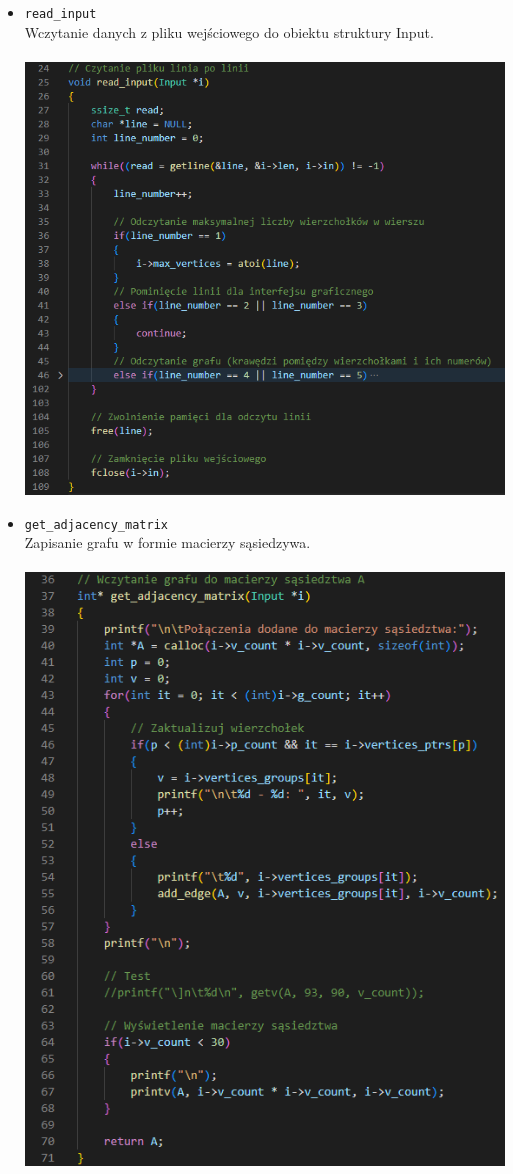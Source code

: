 \documentclass{article}
\begin{document}
\begin{itemize}
        \item \texttt{read\_input} \\
        Wczytanie danych z pliku wejściowego do obiektu struktury Input. \\\\      \includegraphics[width=0.825\linewidth, center]{img/read_input.png}
        
        \item \texttt{get\_adjacency\_matrix} \\
        Zapisanie grafu w formie macierzy sąsiedzywa. \\\\      \includegraphics[width=0.825\linewidth, center]{img/get_adjacency_matrix.png}
        

\end{itemize}
\end{document}
